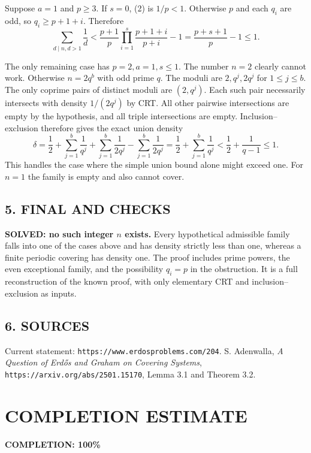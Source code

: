 Suppose $a=1$ and $p\ge3$. If $s=0$, (2) is $1/p<1$. Otherwise $p$ and each $q_i$ are odd, so $q_i\ge p+1+i$. Therefore
\[
 \sum_{d\mid n,d>1}\frac1d
 <\frac{p+1}{p}\prod_{i=1}^s\frac{p+1+i}{p+i}-1
 =\frac{p+s+1}{p}-1\le1.
\]

The only remaining case has $p=2,a=1,s\le1$. The number $n=2$ clearly cannot work. Otherwise $n=2q^b$ with odd prime $q$. The moduli are $2,q^j,2q^j$ for $1\le j\le b$. The only coprime pairs of distinct moduli are $(2,q^j)$. Each such pair necessarily intersects with density $1/(2q^j)$ by CRT. All other pairwise intersections are empty by the hypothesis, and all triple intersections are empty. Inclusion--exclusion therefore gives the exact union density
\[
 \delta=\frac12+\sum_{j=1}^b\frac1{q^j}
          +\sum_{j=1}^b\frac1{2q^j}
          -\sum_{j=1}^b\frac1{2q^j}
 =\frac12+\sum_{j=1}^b\frac1{q^j}
 <\frac12+\frac1{q-1}\le1.
\]
This handles the case where the simple union bound alone might exceed one. For $n=1$ the family is empty and also cannot cover.
\subsection*{5. FINAL AND CHECKS}
\textbf{SOLVED: no such integer $n$ exists.}
Every hypothetical admissible family falls into one of the cases above and has density strictly less than one, whereas a finite periodic covering has density one. The proof includes prime powers, the even exceptional family, and the possibility $q_i=p$ in the obstruction. It is a full reconstruction of the known proof, with only elementary CRT and inclusion--exclusion as inputs.
\subsection*{6. SOURCES}
Current statement: \texttt{https://www.erdosproblems.com/204}. S. Adenwalla, \emph{A Question of Erd\H{o}s and Graham on Covering Systems}, \texttt{https://arxiv.org/abs/2501.15170}, Lemma 3.1 and Theorem 3.2.
\section{COMPLETION ESTIMATE}
\textbf{COMPLETION: 100\%}
